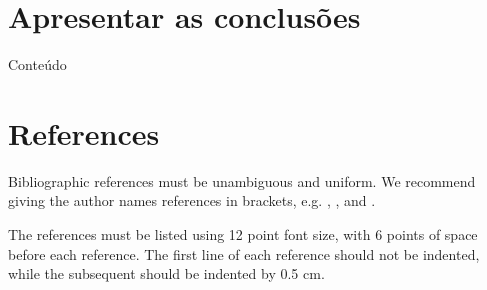 \documentclass[12pt]{article}
\begin{document}
\section{Apresentar as conclusões}
Conteúdo

\section{References}

Bibliographic references must be unambiguous and uniform.  We recommend giving
the author names references in brackets, e.g. \cite{knuth:84},
\cite{boulic:91}, and \cite{smith:99}.

The references must be listed using 12 point font size, with 6 points of space
before each reference. The first line of each reference should not be
indented, while the subsequent should be indented by 0.5 cm.



\end{document}
